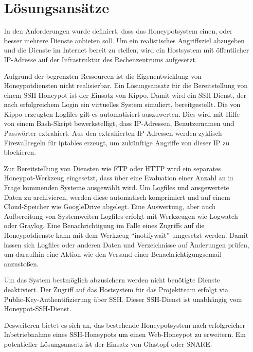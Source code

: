 \chapter{Lösungsansätze}
\label{ch:Lösungsansätze}

In den Anforderungen wurde definiert, dass das Honeypotsystem einen, oder besser mehrere Dienste anbieten soll. Um ein realistisches Angriffsziel abzugeben und die Dienste im Internet bereit zu stellen, wird ein Hostsystem mit öffentlicher IP-Adresse auf der Infrastruktur des Rechenzentrums aufgesetzt.

Aufgrund der begrenzten Ressourcen ist die Eigenentwicklung von Honeypotdiensten  nicht realisierbar. Ein Lösungsansatz für die Bereitstellung von einem SSH-Honeypot ist der Einsatz von Kippo. Damit wird ein SSH-Dienst, der nach erfolgreichem Login ein virtuelles System simuliert, bereitgestellt. Die von Kippo erzeugten Logfiles gilt es automatisiert auszuwerten. Dies wird mit Hilfe von einem Bash-Skript bewerkstelligt, dass IP-Adressen, Benutzernamen und Passwörter extrahiert. Aus den extrahierten IP-Adressen werden zyklisch Firewallregeln für iptables erzeugt, um zukünftige Angriffe von dieser IP zu blockieren.

Zur Bereitstellung von Diensten wie FTP oder HTTP wird ein separates Honeypot-Werkzeug eingesetzt, dass über eine Evaluation einer Anzahl an in Frage kommenden Systeme ausgewählt wird.
Um Logfiles und ausgewertete Daten zu archivieren, werden diese automatisch komprimiert und auf einem Cloud-Speicher wie GoogleDrive abgelegt. Eine Auswertung, aber auch Aufbereitung von Systemweiten Logfiles erfolgt mit Werkzeugen wie Logwatch oder Graylog.
Eine Benachrichtigung im Falle eines Zugriffs auf die Honeypotdienste kann mit dem Werkzeug “inotifywait” umgesetzt werden. Damit lassen sich Logfiles oder anderen Daten und Verzeichnisse auf Änderungen prüfen, um daraufhin eine Aktion wie den Versand einer Benachrichtigungsemail anzustoßen.

Um das System bestmöglich abzusichern werden nicht benötigte Dienste deaktiviert. Der Zugriff auf das Hostsystem für das Projektteam erfolgt via Public-Key-Authentifizierung über SSH. Dieser SSH-Dienst ist unabhängig vom Honeypot-SSH-Dienst.

Desweiteren bietet es sich an, das bestehende Honeypotsystem nach erfolgreicher Inbetriebnahme eines SSH-Honeypots um einen Web-Honeypot zu erweitern. Ein potentieller Lösungsansatz ist der Einsatz von Glastopf oder SNARE.

